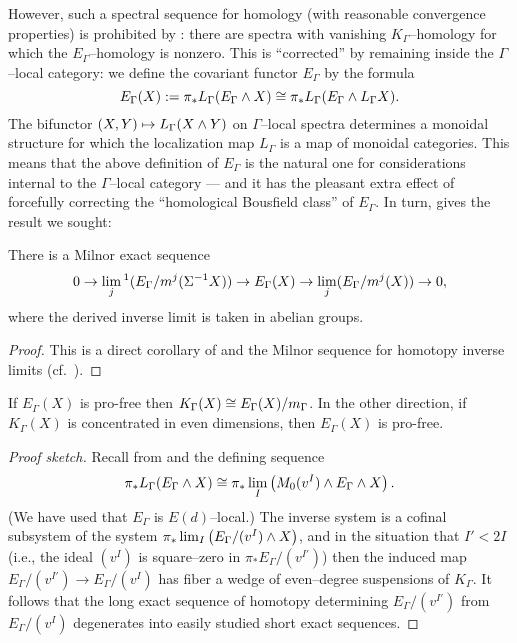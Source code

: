 However, such a spectral sequence for homology (with reasonable convergence properties) is prohibited by : there are spectra with vanishing $K_\Gamma$--homology for which the $E_\Gamma$--homology is nonzero.  This is ``corrected'' by remaining inside the $\Gamma$--local category: we define the covariant functor $E_\Gamma$ by the formula \[E_\Gamma(X) := \pi_* L_\Gamma(E_\Gamma \wedge X) \cong \pi_* L_\Gamma(E_\Gamma \wedge L_\Gamma X).\]  The bifunctor $(X, Y) \mapsto L_\Gamma(X \wedge Y)$ on $\Gamma$--local spectra determines a monoidal structure for which the localization map $L_\Gamma$ is a map of monoidal categories.  This means that the above definition of $E_\Gamma$ is the natural one for considerations internal to the $\Gamma$--local category --- and it has the pleasant extra effect of forcefully correcting the ``homological Bousfield class'' of $E_\Gamma$.  In turn,  gives the result we sought:

\begin{lemma}\label{MilnorSeqForEThy}
There is a Milnor exact sequence \[ 0 \to \lim_j{}^1 (E_\Gamma/m^j (\Sigma^{-1} X)) \to E_\Gamma(X) \to \lim_j (E_\Gamma/m^j(X)) \to 0,\] where the derived inverse limit is taken in abelian groups.
\end{lemma}
\begin{proof}
This is a direct corollary of  and the Milnor sequence for homotopy inverse limits (cf.\ ).
\end{proof}

\begin{corollary}\label{EthyFromKthy}
If $E_\Gamma(X)$ is pro-free then $K_\Gamma(X) \cong E_\Gamma(X) / m_\Gamma$.  In the other direction, if $K_\Gamma(X)$ is concentrated in even dimensions, then $E_\Gamma(X)$ is pro-free.
\end{corollary}
\begin{proof}[Proof sketch]
Recall from  and  the defining sequence
\[
\pi_* L_\Gamma(E_\Gamma \wedge X) \cong \pi_* \lim_I \left( M_0(v^I) \wedge E_\Gamma \wedge X \right).
\]
(We have used that $E_\Gamma$ is $E(d)$--local.)  The inverse system is a cofinal subsystem of the system $\pi_* \lim_I \left(E_\Gamma / (v^I) \wedge X \right)$, and in the situation that $I' < 2I$ (i.e., the ideal $(v^I)$ is square--zero in $\pi_* E_\Gamma / (v^{I'})$) then the induced map $E_\Gamma / (v^{I'}) \to E_\Gamma / (v^I)$ has fiber a wedge of even--degree suspensions of $K_\Gamma$.  It follows that the long exact sequence of homotopy determining $E_\Gamma / (v^{I'})$ from $E_\Gamma / (v^I)$ degenerates into easily studied short exact sequences.
\end{proof}


